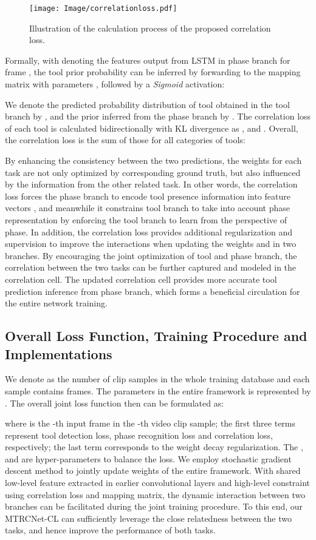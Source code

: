 \documentclass{elsarticle}
\begin{document}
\begin{figure*}[t]
	\centering
	\texttt{[image: Image/correlationloss.pdf]}
	\caption{Illustration of the calculation process of the proposed correlation loss.}
	\label{fig:correlationloss}
\end{figure*}


Formally, with  denoting the features output from LSTM in phase branch for frame , the tool prior probability  can be inferred by forwarding  to the mapping matrix  with parameters , followed by a \textit{Sigmoid} activation:

We denote the predicted probability distribution of tool  obtained in the tool branch by , and the prior inferred from the phase branch by .
The correlation loss of each tool is calculated bidirectionally with KL divergence as , and . Overall, the correlation loss is the sum of those for all categories of tools:

By enhancing the consistency between the two predictions, the weights for each task are not only optimized by corresponding ground truth, but also influenced by the information from the other related task.
In other words, the correlation loss forces the phase branch to encode tool presence information into feature vectors , and meanwhile it constrains tool branch to take into account phase representation by enforcing the tool branch to learn from the perspective of phase.
In addition, the correlation loss provides additional regularization and supervision to improve the interactions when updating the weights  and  in two branches.
By encouraging the joint optimization of tool and phase branch, the correlation between the two tasks can be further captured
and modeled in the correlation cell.
The updated correlation cell provides more accurate tool prediction inference from phase branch, which forms a beneficial circulation for the entire network training.




\subsection{Overall Loss Function, Training Procedure and Implementations}
\label{imple}
We denote  as the number of clip samples in the whole training database and each sample contains  frames.
The parameters in the entire framework is represented by .
The overall joint loss function then can be formulated as:

where  is the -th input frame in the -th video clip sample;
the first three terms represent tool detection loss, phase recognition loss and correlation loss, respectively;
the last term corresponds to the weight decay regularization.
The ,  and  are hyper-parameters to balance the loss.
We employ stochastic gradient descent method to jointly update weights of the entire framework.
With shared low-level feature extracted in earlier convolutional layers and high-level constraint using correlation loss and mapping matrix,
the dynamic interaction between two branches can be facilitated during the joint training procedure.
To this end, our MTRCNet-CL can sufficiently leverage the close relatedness between the two tasks, and hence improve the performance of both tasks.
\end{document}
